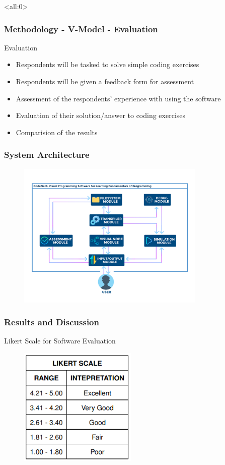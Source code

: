 \documentclass[handout]{beamer}
\begin{document}
\begin{frame}<all:0>
	\frametitle{Methodology - V-Model - Evaluation}
	\begin{block}{Evaluation}
		\begin{itemize}
			\item<1-> Respondents will be tasked to solve simple coding exercises
			\item<2-> Respondents will be given a feedback form for assessment
			\item<3-> Assessment of the respondents' experience with using the software
			\item<4-> Evaluation of their solution/answer to coding exercises
			\item<5-> Comparision of the results
		\end{itemize}
	\end{block}
\end{frame}

\begin{frame}
	\frametitle{System Architecture}
	\begin{figure}
		\includegraphics[width=0.8\textwidth]{figures/theoretical_framework.png}
	\end{figure}
\end{frame}

\begin{frame}
	\frametitle{Results and Discussion}
	\begin{block}{Likert Scale for Software Evaluation}
		\begin{figure}
			\includegraphics[width=0.5\textwidth]{figures/likert_scale.png}
		\end{figure}
	\end{block}
\end{frame}
\end{document}

